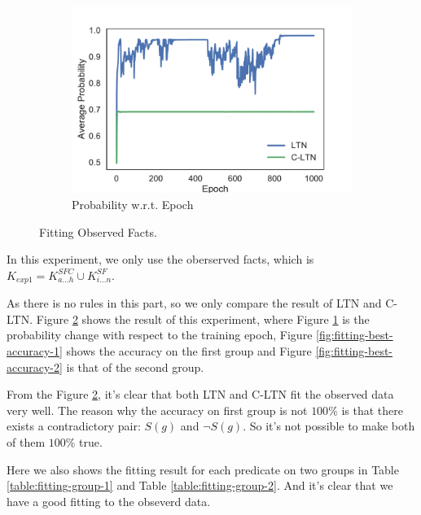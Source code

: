 \begin{figure}[!]
    \begin{subfigure}[]{0.24\textwidth}
        \includegraphics[width=\textwidth]{img/curve1.pdf}
        \caption{Probability w.r.t. Epoch}
        \label{fig:fitting-prob-epoch}
    \end{subfigure}
    \caption{Fitting Observed Facts.}
    \label{fig:fitting}
\end{figure}

In this experiment, we only use the oberserved facts, which is $K_{exp1} = K^{SFC}_{a \dots h} \cup K^{SF}_{i\dots n}$.

As there is no rules in this part, so we only compare the result of LTN and C-LTN.
Figure \ref{fig:fitting} shows the result of this experiment, where Figure \ref{fig:fitting-prob-epoch} is the probability change with respect to the training epoch, Figure \ref{fig:fitting-best-accuracy-1} shows the accuracy on the first group and Figure \ref{fig:fitting-best-accuracy-2} is that of the second group.

From the Figure \ref{fig:fitting}, it's clear that both LTN and C-LTN fit the observed data very well. The reason why the accuracy on first group is not $100\%$ is that there exists a contradictory pair: $S(g)$ and $\neg S(g)$. So it's not possible to make both of them $100\%$ true.

Here we also shows the fitting result for each predicate on two groups in Table \ref{table:fitting-group-1} and Table \ref{table:fitting-group-2}. And it's clear that we have a good fitting to the obseverd data.

